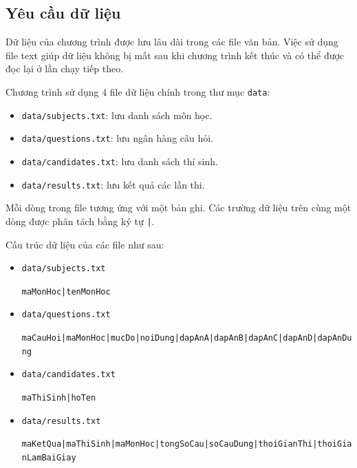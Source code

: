 \documentclass[12pt,a4paper]{report}
\begin{document}
\subsection{Yêu cầu dữ liệu}

Dữ liệu của chương trình được lưu lâu dài trong các file văn bản. Việc sử dụng file text giúp dữ liệu không bị mất sau khi chương trình kết thúc và có thể được đọc lại ở lần chạy tiếp theo.

Chương trình sử dụng 4 file dữ liệu chính trong thư mục \texttt{data}:

\begin{itemize}
    \item \texttt{data/subjects.txt}: lưu danh sách môn học.
    \item \texttt{data/questions.txt}: lưu ngân hàng câu hỏi.
    \item \texttt{data/candidates.txt}: lưu danh sách thí sinh.
    \item \texttt{data/results.txt}: lưu kết quả các lần thi.
\end{itemize}

Mỗi dòng trong file tương ứng với một bản ghi. Các trường dữ liệu trên cùng một dòng được phân tách bằng ký tự \texttt{|}.

Cấu trúc dữ liệu của các file như sau:

\begin{itemize}
    \item \texttt{data/subjects.txt}
    
    \texttt{maMonHoc|tenMonHoc}

    \item \texttt{data/questions.txt}
    
    {\raggedright \texttt{maCauHoi|}\allowbreak\texttt{maMonHoc|}\allowbreak\texttt{mucDo|}\allowbreak\texttt{noiDung|}\allowbreak\texttt{dapAnA|}\allowbreak\texttt{dapAnB|}\allowbreak\texttt{dapAnC|}\allowbreak\texttt{dapAnD|}\allowbreak\texttt{dapAnDung} \par}

    \item \texttt{data/candidates.txt}
    
    \texttt{maThiSinh|hoTen}

    \item \texttt{data/results.txt}
    
    {\raggedright \texttt{maKetQua|}\allowbreak\texttt{maThiSinh|}\allowbreak\texttt{maMonHoc|}\allowbreak\texttt{tongSoCau|}\allowbreak\texttt{soCauDung|}\allowbreak\texttt{thoiGianThi|}\allowbreak\texttt{thoiGianLamBaiGiay} \par}
\end{itemize}
\end{document}

